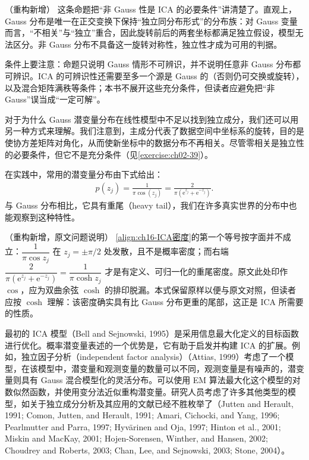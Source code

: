 \documentclass[../../main.tex]{subfiles}
\begin{document}
\begin{remark}（重构新增）
这条命题把“非 Gauss 性是 ICA 的必要条件”讲清楚了。直观上，Gauss 分布是唯一在正交变换下保持“独立同分布形式”的分布族：对 Gauss 变量而言，“不相关”与“独立”重合，因此旋转前后的两套坐标都满足独立假设，模型无法区分。非 Gauss 分布不具备这一旋转对称性，独立性才成为可用的判据。

条件上要注意：命题只说明 Gauss 情形不可辨识，并不说明任意非 Gauss 分布都可辨识。ICA 的可辨识性还需要至多一个源是 Gauss 的（否则仍可交换或旋转），以及混合矩阵满秩等条件；本书不展开这些充分条件，但读者应避免把“非 Gauss”误当成“一定可解”。
\end{remark}

对于为什么 Gauss 潜变量分布在线性模型中不足以找到独立成分，我们还可以用另一种方式来理解。我们注意到，主成分代表了数据空间中坐标系的旋转，目的是使协方差矩阵对角化，从而使新坐标中的数据分布不再相关。尽管零相关是独立性的必要条件，但它不是充分条件（见\cref{exercise:ch02-39}）。

在实践中，常用的潜变量分布由下式给出：
\begin{align}
  p(z_j)=\frac{1}{\pi\cos(z_j)}=\frac{2}{\pi\left(\mathrm{e}^{z_j}+\mathrm{e}^{-z_j}\right)}.
  \label{align:ch16-ICA密度}
\end{align}
与 Gauss 分布相比，它具有重尾（heavy tail），我们在许多真实世界的分布中也能观察到这种特性。

\begin{remark}（重构新增，原文问题说明）
\eqref{align:ch16-ICA密度}的第一个等号按字面并不成立：$\dfrac{1}{\pi\cos z_j}$ 在 $z_j=\pm\pi/2$ 处发散，且不是概率密度；而右端 $\dfrac{2}{\pi(\mathrm{e}^{z_j}+\mathrm{e}^{-z_j})}=\dfrac{1}{\pi\cosh z_j}$ 才是有定义、可归一化的重尾密度。原文此处印作 $\cos$，应为双曲余弦 $\cosh$ 的排印脱漏。本式保留原样以便与原文对照，但读者应按 $\cosh$ 理解：该密度确实具有比 Gauss 分布更重的尾部，这正是 ICA 所需要的性质。
\end{remark}

最初的 ICA 模型（Bell and Sejnowski, 1995）是采用信息最大化定义的目标函数进行优化。概率潜变量表述的一个优势是，它有助于启发并构建 ICA 的扩展。例如，独立因子分析（independent factor analysis）（Attias, 1999）考虑了一个模型，在该模型中，潜变量和观测变量的数量可以不同，观测变量是有噪声的，潜变量则具有 Gauss 混合模型化的灵活分布。可以使用 EM 算法最大化这个模型的对数似然函数，并使用变分法近似重构潜变量。研究人员考虑了许多其他类型的模型，如关于独立成分分析及其应用的文献已经不胜枚举了（Jutten and Herault, 1991; Comon, Jutten, and Herault, 1991; Amari, Cichocki, and Yang, 1996; Pearlmutter and Parra, 1997; Hyv\"arinen and Oja, 1997; Hinton et al., 2001; Miskin and MacKay, 2001; Hojen-Sorensen, Winther, and Hansen, 2002; Choudrey and Roberts, 2003; Chan, Lee, and Sejnowski, 2003; Stone, 2004）。
\end{document}
